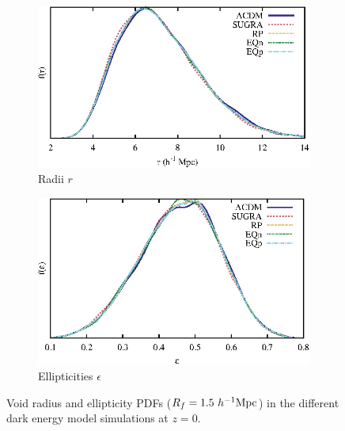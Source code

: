 \begin{figure}
  \begin{subfigure}[b]{\textwidth}
    \centering
    \includegraphics[width=\textwidth]{ch_voidsde/img/radii_models}
    \caption{Radii $r$}
    \label{fig:radii-models}
  \end{subfigure}
  \begin{subfigure}[b]{\textwidth}
    \centering
    \includegraphics[width=\textwidth]{ch_voidsde/img/ell_models}
    \caption{Ellipticities $\epsilon$}
    \label{fig:ell-models}
  \end{subfigure}
	\caption{Void radius and ellipticity PDFs ($R_f = 1.5 ~h^{-1} {\rm Mpc}$) in the different dark energy model simulations at $z=0$.}
	\label{fig:shapes-models}
\end{figure}

